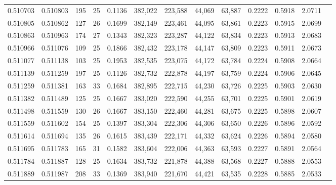 \begin{tabular}{rrrrrrrrrrrrr}
0.510703 & 0.510803 & 195 &  25 &                                     0.1136 & 382,022 & 223,588 &  44,069 &  63,887 & 0.2222 & 0.5918 & 2.0711 \\
0.510805 & 0.510862 & 127 &  26 &                                     0.1699 & 382,149 & 223,461 &  44,095 &  63,861 & 0.2223 & 0.5915 & 2.0699 \\
0.510863 & 0.510963 & 174 &  27 &                                     0.1343 & 382,323 & 223,287 &  44,122 &  63,834 & 0.2223 & 0.5913 & 2.0683 \\
0.510966 & 0.511076 & 109 &  25 &                                     0.1866 & 382,432 & 223,178 &  44,147 &  63,809 & 0.2223 & 0.5911 & 2.0673 \\
0.511077 & 0.511138 & 103 &  25 &                                     0.1953 & 382,535 & 223,075 &  44,172 &  63,784 & 0.2224 & 0.5908 & 2.0664 \\
0.511139 & 0.511259 & 197 &  25 &                                     0.1126 & 382,732 & 222,878 &  44,197 &  63,759 & 0.2224 & 0.5906 & 2.0645 \\
0.511259 & 0.511381 & 163 &  33 &                                     0.1684 & 382,895 & 222,715 &  44,230 &  63,726 & 0.2225 & 0.5903 & 2.0630 \\
0.511382 & 0.511489 & 125 &  25 &                                     0.1667 & 383,020 & 222,590 &  44,255 &  63,701 & 0.2225 & 0.5901 & 2.0619 \\
0.511498 & 0.511559 & 130 &  26 &                                     0.1667 & 383,150 & 222,460 &  44,281 &  63,675 & 0.2225 & 0.5898 & 2.0607 \\
0.511559 & 0.511602 & 154 &  25 &                                     0.1397 & 383,304 & 222,306 &  44,306 &  63,650 & 0.2226 & 0.5896 & 2.0592 \\
0.511614 & 0.511694 & 135 &  26 &                                     0.1615 & 383,439 & 222,171 &  44,332 &  63,624 & 0.2226 & 0.5894 & 2.0580 \\
0.511695 & 0.511783 & 165 &  31 &                                     0.1582 & 383,604 & 222,006 &  44,363 &  63,593 & 0.2227 & 0.5891 & 2.0564 \\
0.511784 & 0.511887 & 128 &  25 &                                     0.1634 & 383,732 & 221,878 &  44,388 &  63,568 & 0.2227 & 0.5888 & 2.0553 \\
0.511889 & 0.511987 & 208 &  33 &                                     0.1369 & 383,940 & 221,670 &  44,421 &  63,535 & 0.2228 & 0.5885 & 2.0533 \\

\end{tabular}
